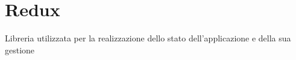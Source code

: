 \section{Redux}
Libreria utilizzata per la realizzazione dello stato dell'applicazione e della sua gestione









